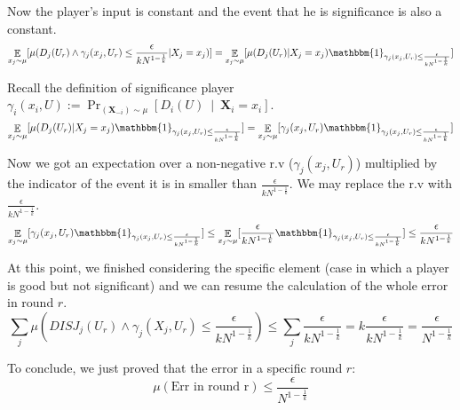 \documentclass{article}
\newcommand{\coloneq}{:=}
\newcommand{\given}{\medspace \middle| \medspace}
\newcommand{\rv}[1]{\mathbf{#1}}
\theoremstyle{plain}
\begin{document}
Now the player's input is constant and the event that he is significance is also a constant.
\begin{equation*}
  \underset{x_j \sim \mu}{\mathop{\mathbb{E}}}[\mu(D_j(U_r) \land \gamma_j(x_j, U_r) \leq \frac{\epsilon}{kN^{1-\frac{1}{k}}} | X_j = x_j)] = \underset{x_j \sim \mu}{\mathop{\mathbb{E}}}[\mu(D_j(U_r) | X_j = x_j) \mathbbm{1}_{\gamma_j(x_j, U_r) \leq \frac{\epsilon}{kN^{1-\frac{1}{k}}}}]
\end{equation*}

Recall the definition of significance player $\gamma_i(x_i, U) \coloneq \Pr_{(\rv{X}_{-i}) \sim \mu}\left[D_i (U) \given \rv{X}_i = x_i \right]$.
\begin{equation*}
  \underset{x_j \sim \mu}{\mathop{\mathbb{E}}}[\mu(D_j(U_r) | X_j = x_j) \mathbbm{1}_{\gamma_j(x_j, U_r) \leq \frac{\epsilon}{kN^{1-\frac{1}{k}}}}] = \underset{x_j \sim \mu}{\mathop{\mathbb{E}}}[\gamma_j(x_j, U_r) \mathbbm{1}_{\gamma_j(x_j, U_r) \leq \frac{\epsilon}{kN^{1-\frac{1}{k}}}}]
\end{equation*}

Now we got an expectation over a non-negative r.v ($\gamma_j(x_j, U_r)$) multiplied by the indicator of the event it is in smaller than $\frac{\epsilon}{kN^{1-\frac{1}{k}}}$. We may replace the r.v with $\frac{\epsilon}{kN^{1-\frac{1}{k}}}$.
\begin{equation*}
  \underset{x_j \sim \mu}{\mathop{\mathbb{E}}}[\gamma_j(x_j, U_r) \mathbbm{1}_{\gamma_j(x_j, U_r) \leq \frac{\epsilon}{kN^{1-\frac{1}{k}}}}] \leq \underset{x_j \sim \mu}{\mathop{\mathbb{E}}}[\frac{\epsilon}{kN^{1-\frac{1}{k}}} \mathbbm{1}_{\gamma_j(x_j, U_r) \leq \frac{\epsilon}{kN^{1-\frac{1}{k}}}}] \leq \frac{\epsilon}{kN^{1-\frac{1}{k}}}
\end{equation*}

At this point, we finished considering the specific element (case in which a player is good but not significant) and we can resume the calculation of the whole error in round $r$.  \newline
\begin{equation*}
  \sum_j \mu(DISJ_j(U_r) \land \gamma_j(X_j, U_r) \leq \frac{\epsilon}{kN^{1-\frac{1}{k}}}) \leq \sum_j \frac{\epsilon}{kN^{1-\frac{1}{k}}} = k\frac{\epsilon}{kN^{1-\frac{1}{k}}} = \frac{\epsilon}{N^{1-\frac{1}{k}}}
\end{equation*}

To conclude, we just proved that the error in a specific round $r$:
\begin{equation*}
  \mu(\text{Err in round r}) \leq \frac{\epsilon}{N^{1-\frac{1}{k}}}
\end{equation*}
\end{document}
